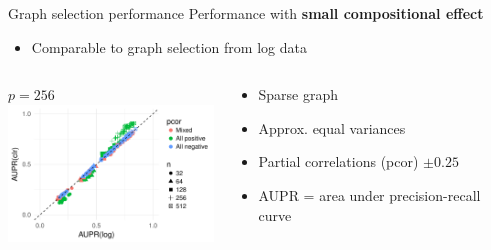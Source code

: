 \documentclass[professionalfonts]{beamer}
\begin{document}
\begin{frame}{Graph selection performance}
Performance with \textbf{small compositional effect}
\begin{itemize}
\item Comparable to graph selection from log data
\end{itemize}
\begin{columns}
\begin{column}{0.6\textwidth}
\begin{center}
$p = 256$ \\
\includegraphics[width=210px]{figs/scalefree-aupr-256.pdf}
\end{center}
\end{column}
\begin{column}{0.35\textwidth}
\begin{small}
\begin{itemize}
\item Sparse graph
\item Approx. equal variances
\item Partial correlations (pcor) $\pm 0.25$
\item AUPR = area under precision-recall curve
\end{itemize}
\end{small}
\end{column}
\end{columns}
\end{frame}
\end{document}
